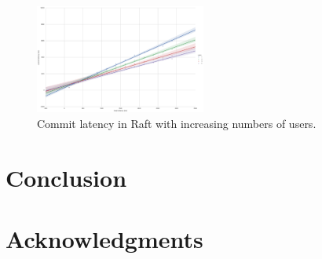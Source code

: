 \documentclass[letterpaper,twocolumn,10pt]{article}
\begin{document}
\begin{figure}[h]
    \centering
    \includegraphics[width=0.5\textwidth]{figures/raft_commit_latency}
    \caption{Commit latency in Raft with increasing numbers of users.}
\end{figure}

\section{Conclusion}

\section*{Acknowledgments}

{\footnotesize 
}

\end{document}
